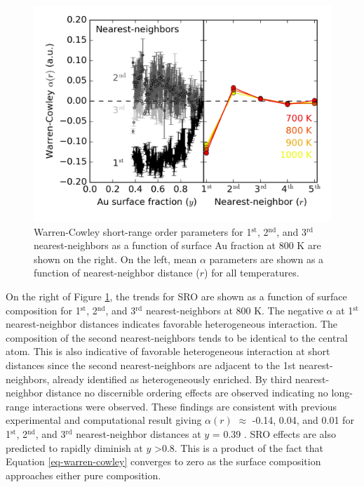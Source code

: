 \documentclass[12pt,oneside]{cmuthesis}
\begin{document}
\begin{figure}[h]
\centering
\includegraphics[width=5.5in]{./images/warren-cowley.png}
\caption{\label{fig-warren-cowley}
Warren-Cowley short-range order parameters for 1\(^{\text{st}}\), 2\(^{\text{nd}}\), and 3\(^{\text{rd}}\) nearest-neighbors as a function of surface Au fraction at 800 K are shown on the right. On the left, mean \(\alpha\) parameters are shown as a function of nearest-neighbor distance (\(r\)) for all temperatures.}
\end{figure}

On the right of Figure \ref{fig-warren-cowley}, the trends for SRO are shown as a function of surface composition for 1\(^{\text{st}}\), 2\(^{\text{nd}}\), and 3\(^{\text{rd}}\) nearest-neighbors at 800 K. The negative \(\alpha\) at 1\(^{\text{st}}\) nearest-neighbor distances indicates favorable heterogeneous interaction. The composition of the second nearest-neighbors tends to be identical to the central atom. This is also indicative of favorable heterogeneous interaction at short distances since the second nearest-neighbors are adjacent to the 1st nearest-neighbors, already identified as heterogeneously enriched. By third nearest-neighbor distance no discernible ordering effects are observed indicating no long-range interactions were observed. These findings are consistent with previous experimental and computational result giving \(\alpha(r)\) \(\approx\) -0.14, 0.04, and 0.01 for 1\(^{\text{st}}\), 2\(^{\text{nd}}\), and 3\(^{\text{rd}}\) nearest-neighbor distances at \(y\) = 0.39  \cite{sadigh-1999-short-range}. SRO effects are also predicted to rapidly diminish at \(y\) \textgreater 0.8. This is a product of the fact that Equation \ref{eq-warren-cowley} converges to zero as the surface composition approaches either pure composition.
\end{document}
